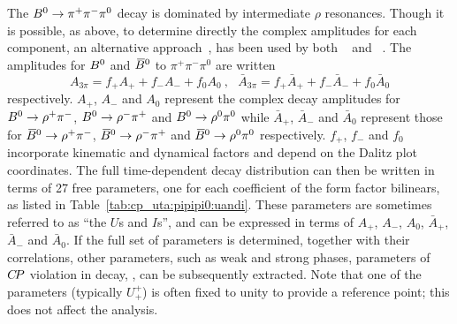 The $B^0 \to \pi^+\pi^-\pi^0$ decay is dominated by 
intermediate $\rho$ resonances.
Though it is possible, as above, 
to determine directly the complex amplitudes for each component,
an alternative approach~\cite{Snyder:1993mx,Quinn:2000by},
has been used by both \babar~\cite{Aubert:2007jn,Lees:2013nwa}
and \belle~\cite{Kusaka:2007dv,:2007mj}.
The amplitudes for $B^0$ and $\kern 0.18em\overline{\kern -0.18em B}{}^0$ to $\pi^+\pi^-\pi^0$ are written
\begin{equation}
  A_{3\pi} = f_+ A_+ + f_- A_- + f_0 A_0
  \ , \ \ \ 
  \bar{A}_{3\pi} = f_+ \bar{A}_+ + f_- \bar{A}_- + f_0 \bar{A}_0
\end{equation}
respectively.
$A_+$, $A_-$ and $A_0$
represent the complex decay amplitudes for 
$B^0 \to \rho^+\pi^-$, $B^0 \to \rho^-\pi^+$ and $B^0 \to \rho^0\pi^0$
while 
$\bar{A}_+$, $\bar{A}_-$ and $\bar{A}_0$
represent those for 
$\kern 0.18em\overline{\kern -0.18em B}{}^0 \to \rho^+\pi^-$, $\kern 0.18em\overline{\kern -0.18em B}{}^0 \to \rho^-\pi^+$ and $\kern 0.18em\overline{\kern -0.18em B}{}^0 \to \rho^0\pi^0$
respectively.
$f_+$, $f_-$ and $f_0$ incorporate kinematic and dynamical factors
and depend on the Dalitz plot coordinates.
The full time-dependent decay distribution can then be written 
in terms of 27 free parameters,
one for each coefficient of the form factor bilinears,
as listed in Table~\ref{tab:cp_uta:pipipi0:uandi}.
These parameters are sometimes referred to as ``the $U$s and $I$s'',
and can be expressed in terms of 
$A_+$, $A_-$, $A_0$, $\bar{A}_+$, $\bar{A}_-$ and $\bar{A}_0$.
If the full set of parameters is determined,
together with their correlations,
other parameters, such as weak and strong phases,
parameters of $C\!P$ violation in decay, \etc, 
can be subsequently extracted.
Note that one of the parameters (typically $U_+^+$)
is often fixed to unity to provide a reference point;
this does not affect the analysis.


